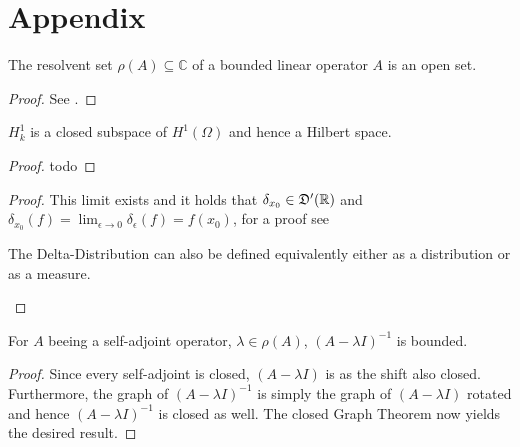 \chapter*{Appendix}  

\begin{atheorem}
	The resolvent set $\rho(A) \subseteq \mathbb{C}$ of a bounded linear operator $A$ is an open set.
	
	\begin{proof}
		See \cite[p. 259]{werner2006funkana}.
	\end{proof}
\end{atheorem}

\begin{atheorem} \label{h1kclosed}
	$H^{1}_{k}$ is a closed subspace of $H^{1}(\Omega)$ and hence a Hilbert space.

	\begin{proof}
		todo %
	\end{proof}
\end{atheorem}

\begin{atheorem} \label{athem:delta}
	
	\begin{proof}
		 	This limit exists and it holds that $\delta_{x_{0}} \in \mathfrak{D}'(\mathbb{R})$ and $\delta_{x_{0}}(f) = \lim_{\epsilon \rightarrow 0} \delta_{\epsilon}(f) = f(x_{0})$, for a proof see
 		\begin{remark}
 		 The Delta-Distribution can also be defined equivalently either as a 	distribution or as a measure.
 		\end{remark}
	\end{proof}
\end{atheorem}

\begin{atheorem}
	For $A$ beeing a self-adjoint operator, $\lambda \in \rho(A)$, $(A - \lambda I)^{-1}$ is bounded.
	
	\begin{proof}
		Since every self-adjoint is closed, $(A - \lambda I)$ is as the shift also closed. Furthermore, the graph of $(A - \lambda I)^{-1}$ is simply the graph of $(A - \lambda I)$ rotated and hence $(A - \lambda I)^{-1}$ is closed as well. The closed Graph Theorem now yields the desired result.
	\end{proof}
\end{atheorem}

